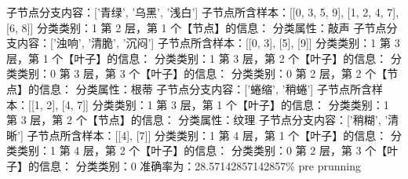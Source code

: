 \documentclass{ctexart}
\begin{document}
\begin{tcolorbox}[colframe = blue, colback = blue!10!white ,  breakable]
        子节点分支内容：['青绿', '乌黑', '浅白']\newline
        子节点所含样本：[[0, 3, 5, 9], [1, 2, 4, 7], [6, 8]]\newline
        分类类别：1\newline
第 2 层，第 1 个【节点】的信息：\newline
        分类属性：敲声\newline
        子节点分支内容：['浊响', '清脆', '沉闷']\newline
        子节点所含样本：[[0, 3], [5], [9]]\newline
        分类类别：1\newline
第 3 层，第 1 个【叶子】的信息：\newline
        分类类别：1\newline
第 3 层，第 2 个【叶子】的信息：\newline
        分类类别：0\newline
第 3 层，第 3 个【叶子】的信息：\newline
        分类类别：0\newline
第 2 层，第 2 个【节点】的信息：\newline
        分类属性：根蒂\newline
        子节点分支内容：['蜷缩', '稍蜷']\newline
        子节点所含样本：[[1, 2], [4, 7]]\newline
        分类类别：1\newline
第 3 层，第 1 个【叶子】的信息：\newline
        分类类别：1\newline
第 3 层，第 2 个【节点】的信息：\newline
        分类属性：纹理\newline
        子节点分支内容：['稍糊', '清晰']\newline
        子节点所含样本：[[4], [7]]\newline
        分类类别：1\newline
第 4 层，第 1 个【叶子】的信息：\newline
        分类类别：1\newline
第 4 层，第 2 个【叶子】的信息：\newline
        分类类别：0\newline
第 2 层，第 3 个【叶子】的信息：\newline
        分类类别：0\newline
准确率为：28.57142857142857\%\newline
pre prunning\newline

\end{tcolorbox}
\end{document}
